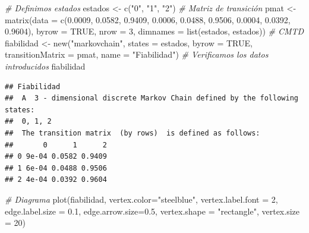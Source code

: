 \documentclass[
]{book}
\newenvironment{Shaded}{\begin{snugshade}}{\end{snugshade}}
\newcommand{\AttributeTok}[1]{\textcolor[rgb]{0.77,0.63,0.00}{#1}}
\newcommand{\CommentTok}[1]{\textcolor[rgb]{0.56,0.35,0.01}{\textit{#1}}}
\newcommand{\ConstantTok}[1]{\textcolor[rgb]{0.00,0.00,0.00}{#1}}
\newcommand{\DecValTok}[1]{\textcolor[rgb]{0.00,0.00,0.81}{#1}}
\newcommand{\FloatTok}[1]{\textcolor[rgb]{0.00,0.00,0.81}{#1}}
\newcommand{\FunctionTok}[1]{\textcolor[rgb]{0.00,0.00,0.00}{#1}}
\newcommand{\NormalTok}[1]{#1}
\newcommand{\OtherTok}[1]{\textcolor[rgb]{0.56,0.35,0.01}{#1}}
\newcommand{\StringTok}[1]{\textcolor[rgb]{0.31,0.60,0.02}{#1}}
\theoremstyle{definition}
\theoremstyle{definition}
\theoremstyle{definition}
\theoremstyle{definition}
\theoremstyle{remark}
\begin{document}
\begin{Shaded}
\begin{Highlighting}[]
\CommentTok{\# Definimos estados}
\NormalTok{estados }\OtherTok{\textless{}{-}} \FunctionTok{c}\NormalTok{(}\StringTok{"0"}\NormalTok{, }\StringTok{"1"}\NormalTok{, }\StringTok{"2"}\NormalTok{)}
\CommentTok{\# Matriz de transición }
\NormalTok{pmat }\OtherTok{\textless{}{-}} \FunctionTok{matrix}\NormalTok{(}\AttributeTok{data =} \FunctionTok{c}\NormalTok{(}\FloatTok{0.0009}\NormalTok{, }\FloatTok{0.0582}\NormalTok{, }\FloatTok{0.9409}\NormalTok{, }
                        \FloatTok{0.0006}\NormalTok{, }\FloatTok{0.0488}\NormalTok{, }\FloatTok{0.9506}\NormalTok{, }
                        \FloatTok{0.0004}\NormalTok{, }\FloatTok{0.0392}\NormalTok{, }\FloatTok{0.9604}\NormalTok{), }
               \AttributeTok{byrow =} \ConstantTok{TRUE}\NormalTok{, }\AttributeTok{nrow =} \DecValTok{3}\NormalTok{, }
               \AttributeTok{dimnames =} \FunctionTok{list}\NormalTok{(estados, estados))}
\CommentTok{\# CMTD}
\NormalTok{fiabilidad }\OtherTok{\textless{}{-}} \FunctionTok{new}\NormalTok{(}\StringTok{"markovchain"}\NormalTok{, }\AttributeTok{states =}\NormalTok{ estados, }
                 \AttributeTok{byrow =} \ConstantTok{TRUE}\NormalTok{, }\AttributeTok{transitionMatrix =}\NormalTok{ pmat, }
                 \AttributeTok{name =} \StringTok{"Fiabilidad"}\NormalTok{)}
\CommentTok{\# Verificamos los datos introducidos}
\NormalTok{fiabilidad}
\end{Highlighting}
\end{Shaded}

\begin{verbatim}
## Fiabilidad 
##  A  3 - dimensional discrete Markov Chain defined by the following states: 
##  0, 1, 2 
##  The transition matrix  (by rows)  is defined as follows: 
##       0      1      2
## 0 9e-04 0.0582 0.9409
## 1 6e-04 0.0488 0.9506
## 2 4e-04 0.0392 0.9604
\end{verbatim}

\begin{Shaded}
\begin{Highlighting}[]
\CommentTok{\# Diagrama}
\FunctionTok{plot}\NormalTok{(fiabilidad, }\AttributeTok{vertex.color=}\StringTok{"steelblue"}\NormalTok{, }
     \AttributeTok{vertex.label.font =} \DecValTok{2}\NormalTok{, }
     \AttributeTok{edge.label.size =} \FloatTok{0.1}\NormalTok{,}
     \AttributeTok{edge.arrow.size=}\FloatTok{0.5}\NormalTok{, }
     \AttributeTok{vertex.shape =} \StringTok{"rectangle"}\NormalTok{, }
     \AttributeTok{vertex.size =} \DecValTok{20}\NormalTok{)}
\end{Highlighting}
\end{Shaded}
\end{document}
